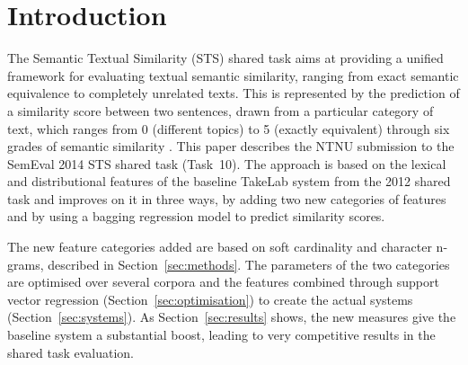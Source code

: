 \section{Introduction}
\label{intro}

%
% 

The Semantic Textual Similarity (STS) shared task aims at providing a unified framework for evaluating textual semantic similarity, ranging from exact semantic equivalence to completely unrelated texts. This is represented by the prediction of a similarity score between two sentences, drawn from a particular category of text, which ranges from 0 (different topics) to 5 (exactly equivalent) through six grades of semantic similarity \cite{agirre-EtAl:2013:*SEM1}.
This paper describes the NTNU submission to the SemEval 2014 STS shared task (Task~10). 
The approach is based on the lexical and distributional features of the baseline TakeLab system 
from the 2012 shared task \cite{saric2012takelab} and improves on it in three ways,
by adding two new categories of features and by using a bagging regression model to predict similarity scores. 

The new feature categories added are based on soft cardinality and character n-grams,
described in Section~\ref{sec:methods}.
The parameters of the two categories are optimised over several corpora and the features
combined through support vector regression (Section~\ref{sec:optimisation})
to create the actual systems (Section~\ref{sec:systems}).
As Section~\ref{sec:results} shows, the new measures give 
the baseline system a substantial boost, leading to
very competitive results in the shared task evaluation.

